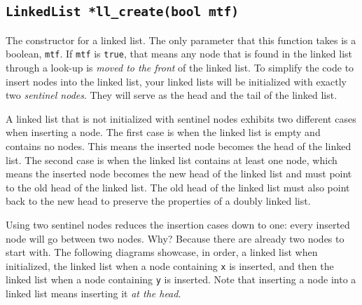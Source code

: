 \documentclass{article}
\begin{document}
\subsection{\texttt{LinkedList *ll\_create(bool mtf)}}

The constructor for a linked list. The only parameter that this function
takes is a boolean, \texttt{mtf}. If \texttt{mtf} is \texttt{true}, that
means any node that is found in the linked list through a look-up is
\emph{moved to the front} of the linked list. To simplify the code to
insert nodes into the linked list, your linked lists will be initialized
with exactly two \emph{sentinel nodes}. They will serve as the head and
the tail of the linked list.

A linked list that is not initialized with sentinel nodes exhibits two
different cases when inserting a node. The first case is when the linked
list is empty and contains no nodes. This means the inserted node
becomes the head of the linked list. The second case is when the linked
list contains at least one node, which means the inserted node becomes
the new head of the linked list and must point to the old head of the
linked list. The old head of the linked list must also point back to the
new head to preserve the properties of a doubly linked list.

Using two sentinel nodes reduces the insertion cases down to one: every
inserted node will go between two nodes. Why? Because there are already
two nodes to start with. The following diagrams showcase, in order, a
linked list when initialized, the linked list when a node containing
\texttt{x} is inserted, and then the linked list when a node containing
\texttt{y} is inserted. Note that inserting a node into a linked list
means inserting it \emph{at the head}.

\begin{center}
\end{center}
\end{document}
